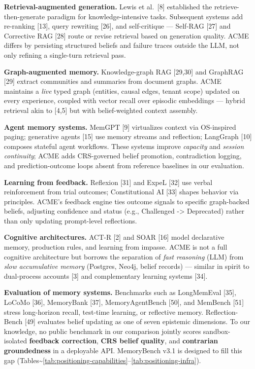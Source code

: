 \documentclass[11pt,a4paper]{article}
\begin{document}
\textbf{Retrieval-augmented generation.} Lewis et al.~{[}8{]}
established the retrieve-then-generate paradigm for knowledge-intensive
tasks. Subsequent systems add re-ranking {[}13{]}, query rewriting
{[}26{]}, and self-critique --- Self-RAG {[}27{]} and Corrective RAG
{[}28{]} route or revise retrieval based on generation quality. ACME
differs by persisting structured beliefs and failure traces outside the
LLM, not only refining a single-turn retrieval pass.

\textbf{Graph-augmented memory.} Knowledge-graph RAG {[}29,30{]} and
GraphRAG {[}29{]} extract communities and summaries from document
graphs. ACME maintains a \emph{live} typed graph (entities, causal
edges, tenant scope) updated on every experience, coupled with vector
recall over episodic embeddings --- hybrid retrieval akin to {[}4,5{]}
but with belief-weighted context assembly.

\textbf{Agent memory systems.} MemGPT {[}9{]} virtualizes context via
OS-inspired paging; generative agents {[}15{]} use memory streams and
reflection; LangGraph {[}10{]} composes stateful agent workflows. These
systems improve \emph{capacity} and \emph{session continuity}; ACME adds
CRS-governed belief promotion, contradiction logging, and
prediction-outcome loops absent from reference baselines in our
evaluation.

\textbf{Learning from feedback.} Reflexion {[}31{]} and ExpeL {[}32{]}
use verbal reinforcement from trial outcomes; Constitutional AI {[}33{]}
shapes behavior via principles. ACME's feedback engine ties outcome
signals to specific graph-backed beliefs, adjusting confidence and
status (e.g., Challenged -\textgreater{} Deprecated) rather than only
updating prompt-level reflections.

\textbf{Cognitive architectures.} ACT-R {[}2{]} and SOAR {[}16{]} model
declarative memory, production rules, and learning from impasse. ACME is
not a full cognitive architecture but borrows the separation of
\emph{fast reasoning} (LLM) from \emph{slow accumulative memory}
(Postgres, Neo4j, belief records) --- similar in spirit to dual-process
accounts {[}3{]} and complementary learning systems {[}34{]}.

\textbf{Evaluation of memory systems.} Benchmarks such as LongMemEval
{[}35{]}, LoCoMo {[}36{]}, MemoryBank {[}37{]}, MemoryAgentBench
{[}50{]}, and MemBench {[}51{]} stress long-horizon recall, test-time
learning, or reflective memory. Reflection-Bench {[}49{]} evaluates
belief updating as one of seven epistemic dimensions. To our knowledge,
no public benchmark in our comparison jointly scores sandbox-isolated
\textbf{feedback correction}, \textbf{CRS belief quality}, and
\textbf{contrarian groundedness} in a deployable API. MemoryBench v3.1
is designed to fill this gap
(Tables\textasciitilde{}\ref{tab:positioning-capabilities}--\ref{tab:positioning-infra}).
\end{document}
